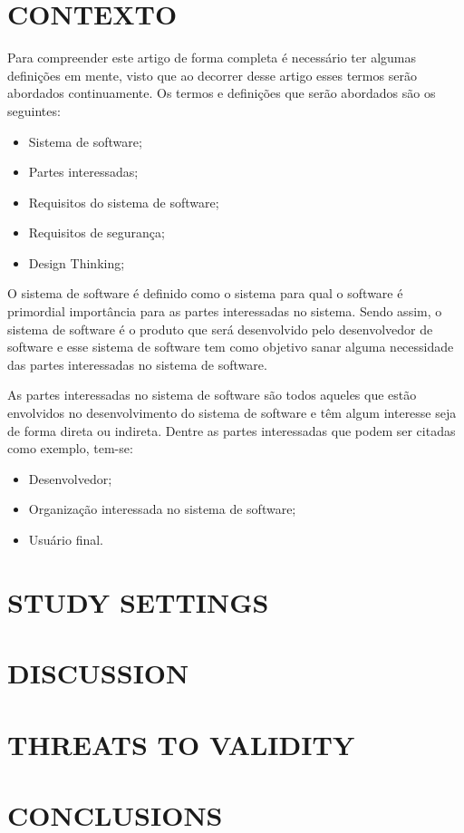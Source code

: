\documentclass[a4paper,twoside]{article}
\begin{document}
\section{\uppercase{Contexto}}

Para compreender este artigo de forma completa é necessário ter algumas definições em mente, visto que ao decorrer desse artigo esses termos serão abordados continuamente. Os termos e definições que serão abordados são os seguintes:
\begin{itemize}
    \item Sistema de software;
    \item Partes interessadas;
    \item Requisitos do sistema de software;
    \item Requisitos de segurança;
    \item Design Thinking;
\end{itemize}
O sistema de software é definido como o sistema para qual o software é primordial importância para as partes interessadas no sistema\cite{sevocab}. Sendo assim, o sistema de software é o produto que será desenvolvido pelo desenvolvedor de software e esse sistema de software tem como objetivo sanar alguma necessidade das partes interessadas no sistema de software. 

As partes interessadas no sistema de software são todos aqueles que estão envolvidos no desenvolvimento do sistema de software e têm algum interesse seja de forma direta ou indireta. Dentre as partes interessadas que podem ser citadas como exemplo, tem-se\cite{sevocab}:
\begin{itemize}
    \item Desenvolvedor;
    \item Organização interessada no sistema de software;
    \item Usuário final.
\end{itemize}

\section{\uppercase{Study Settings}}

\section{\uppercase{Discussion}}

\section{\uppercase{Threats to Validity}}

\section{\uppercase{Conclusions}}



{\small 
}
\end{document}
